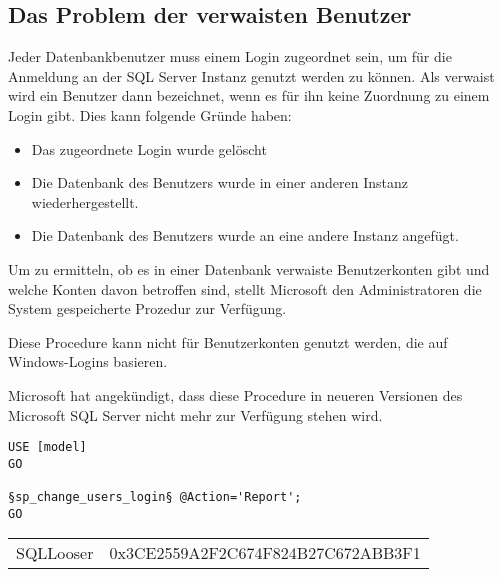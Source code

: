         \subsection{Das Problem der verwaisten Benutzer}
          Jeder Datenbankbenutzer muss einem Login zugeordnet sein, um für die
          Anmeldung an der SQL Server Instanz genutzt werden zu können. Als
          verwaist wird ein Benutzer dann bezeichnet, wenn es für ihn keine
          Zuordnung zu einem Login gibt. Dies kann folgende Gründe haben:
          \begin{itemize}
            \item Das zugeordnete Login wurde gelöscht
            \item Die Datenbank des Benutzers wurde in einer anderen Instanz
            wiederhergestellt.
            \item Die Datenbank des Benutzers wurde an eine andere Instanz
            angefügt.
          \end{itemize}
          Um zu ermitteln, ob es in einer Datenbank verwaiste Benutzerkonten
          gibt und welche Konten davon betroffen sind, stellt Microsoft den
          Administratoren die System gespeicherte Prozedur
           zur Verfügung.
          \begin{merke}
            Diese Procedure kann nicht für Benutzerkonten genutzt werden, die
            auf Windows-Logins basieren.
            
            Microsoft hat angekündigt, dass diese Procedure in neueren
            Versionen des Microsoft SQL Server nicht mehr zur Verfügung stehen
            wird.
          \end{merke}
          \begin{lstlisting}[language=ms_sql, caption={Ermitteln der
            verwaisten Benutzerkonten}, label=admin19_16]
USE [model]
GO

§sp_change_users_login§ @Action='Report';
GO
          \end{lstlisting}
          \begin{center}
            \begin{small}
              \tablehead{}
              \tabletail {
              }
              \tablelasttail {
              }
              \begin{mssql}
                \begin{supertabular}{ll}
                  SQLLooser & 0x3CE2559A2F2C674F824B27C672ABB3F1 \\
                \end{supertabular}
              \end{mssql}
            \end{small}
          \end{center}
